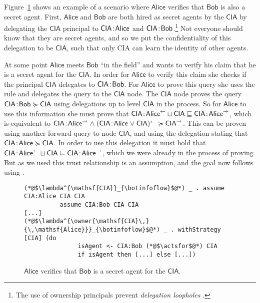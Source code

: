 Figure~\ref{fig:govt-alice-checks-bob} shows an example of a scenario where $\mathsf{Alice}$ verifies that $\mathsf{Bob}$ is also a secret agent. First, $\mathsf{Alice}$ and $\mathsf{Bob}$ are both hired as secret agents by the $\mathsf{CIA}$ by delegating the $\mathsf{CIA}$ principal to $\mathsf{CIA}\!:\!\mathsf{Alice}$ and $\mathsf{CIA}\!:\!\mathsf{Bob}$.\footnote{The use of ownership principals prevent \emph{delegation loopholes} \cite{Arden:2015:FA:2859845.2859998}.} Not everyone should know that they are secret agents, and so we put the confidentiality of this delegation to be $\mathsf{CIA}$, such that only CIA can learn the identity of other agents.

At some point $\mathsf{Alice}$ meets $\mathsf{Bob}$ ``in the field'' and wants to verify his claim that he is a secret agent for the $\mathsf{CIA}$. In order for $\mathsf{Alice}$ to verify this claim she checks if the principal $\mathsf{CIA}$ delegates to $\mathsf{CIA}\!:\!\mathsf{Bob}$. For $\mathsf{Alice}$ to prove this query she uses the  rule and delegates the query to the $\mathsf{CIA}$ node. The $\mathsf{CIA}$ node proves the query $\mathsf{CIA}\!:\!\mathsf{Bob} \succcurlyeq \mathsf{CIA}$ using delegations up to level $\mathsf{CIA}$ in the process. So for $\mathsf{Alice}$ to use this information she must prove that $\mathsf{CIA}\!:\!\mathsf{Alice}^{\leftarrow} \sqcup \mathsf{CIA} \sqsubseteq \mathsf{CIA}\!:\!\mathsf{Alice}^{\rightarrow}$, which is equivalent to $\mathsf{CIA}\!:\!\mathsf{Alice}^{\rightarrow} \mathrel{\land} (\mathsf{CIA}\!:\!\mathsf{Alice} \mathrel{\lor} \mathsf{CIA})^{\leftarrow} \succcurlyeq \mathsf{CIA}^{\rightarrow}$. This can be proven using another forward query to node $\mathsf{CIA}$, and using the delegation stating that $\mathsf{CIA}\!:\!\mathsf{Alice} \succcurlyeq \mathsf{CIA}$. In order to use this delegation it must hold that $\mathsf{CIA}\!:\!\mathsf{Alice}^{\leftarrow} \sqcup \mathsf{CIA} \sqsubseteq \mathsf{CIA}\!:\!\mathsf{Alice}^{\rightarrow}$, which we were already in the process of proving. But as we used  this trust relationship is an assumption, and the goal now follows using .

\begin{figure}
\centering
\begin{lstlisting}
(*@$\lambda^{\mathsf{CIA}}_{\botinfoflow}$@*) _ . assume CIA:Alice CIA CIA
          assume CIA:Bob CIA CIA
[...]
(*@$\lambda^{\owner{\mathsf{CIA}\,}{\,\mathsf{Alice}}}_{\botinfoflow}$@*) _ . withStrategy [CIA] (do
               isAgent <- CIA:Bob (*@$\actsfor$@*) CIA
               if isAgent then [...] else [...])
\end{lstlisting}
\caption{$\mathsf{Alice}$ verifies that $\mathsf{Bob}$ is a secret agent for the $\mathsf{CIA}$.}
\label{fig:govt-alice-checks-bob}
\end{figure}